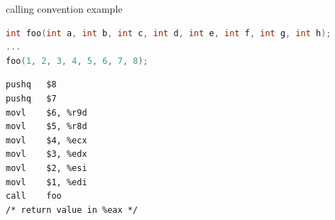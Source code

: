 \begin{frame}[fragile,label=conventionEx]{calling convention example}
\begin{lstlisting}[language=C,style=small]
int foo(int a, int b, int c, int d, int e, int f, int g, int h);
...
foo(1, 2, 3, 4, 5, 6, 7, 8);
\end{lstlisting}
\begin{lstlisting}[language=myasm,style=small]
pushq   $8
pushq   $7
movl    $6, %r9d
movl    $5, %r8d
movl    $4, %ecx
movl    $3, %edx
movl    $2, %esi
movl    $1, %edi
call    foo
/* return value in %eax */
\end{lstlisting}
\end{frame}

